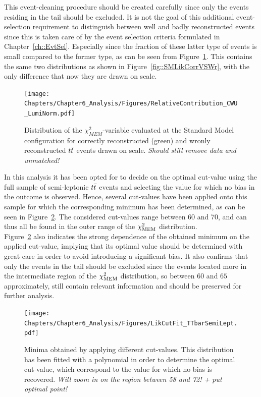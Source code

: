 This event-cleaning procedure should be created carefully since only the events residing in the tail should be excluded. It is not the goal of this additional event-selection requirement to distinguish between well and badly reconstructed events since this is taken care of by the event selection criteria formulated in Chapter~\ref{ch::EvtSel}.
Especially since the fraction of these latter type of events is small compared to the former type, as can be seen from Figure~\ref{fig::SMLikCorrVSWrUnSc}. This contains the same two distributions as shown in Figure~\ref{fig::SMLikCorrVSWr}, with the only difference that now they are drawn on scale.
\\
\begin{figure}[h!t]
 \centering
 \texttt{[image: Chapters/Chapter6\_Analysis/Figures/RelativeContribution\_CWU\_LumiNorm.pdf]}
 \caption{Distribution of the $\chi^{2}_{MEM}$-variable evaluated at the Standard Model configuration for correctly reconstructed (green) and wronly reconstructed $t\bar{t}$ events drawn on scale. \textit{Should still remove data and unmatched!}} \label{fig::SMLikCorrVSWrUnSc}
\end{figure}

In this analysis it has been opted for to decide on the optimal cut-value using the full sample of semi-leptonic $t\bar{t}$ events and selecting the value for which no bias in the outcome is observed.
Hence, several cut-values have been applied onto this sample for which the corresponding minimum has been determined, as can be seen in Figure~\ref{fig::CutValueFit}.
The considered cut-values range between 60 and 70, and can thus all be found in the outer range of the $\chi^{2}_{\textrm{MEM}}$ distribution.
\\
Figure~\ref{fig::CutValueFit} also indicates the strong dependence of the obtained minimum on the applied cut-value, implying that its optimal value should be determined with great care in order to avoid introducing a significant bias. It also confirms that only the events in the tail should be excluded since the events located more in the intermediate region of the $\chi^{2}_{\textrm{MEM}}$ distribution, so between $60$ and $65$ approximately, still contain relevant information and should be preserved for further analysis.
\\
\begin{figure}[h!t]
 \centering
 \texttt{[image: Chapters/Chapter6\_Analysis/Figures/LikCutFit\_TTbarSemiLept.pdf]}
 \caption{Minima obtained by applying different cut-values. This distribution has been fitted with a polynomial in order to determine the optimal cut-value, which correspond to the value for which no bias is recovered. \textit{Will zoom in on the region between 58 and 72! + put optimal point!}} \label{fig::CutValueFit}
\end{figure}


